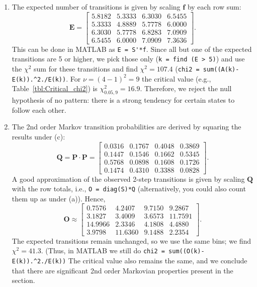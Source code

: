 \begin{enumerate}[label=\alph*)]
\item The expected number of transitions is given by scaling $\mathbf{f}$ by each row sum:
$$
\mathbf{E} = \left [ \begin{array}{cccc}
    5.8182  &  5.3333  &  6.3030  &  6.5455 \\
    5.3333  &  4.8889  &  5.7778  &  6.0000 \\
    6.3030  &  5.7778 &   6.8283  &  7.0909 \\
    6.5455  &  6.0000 &   7.0909  &  7.3636
\end{array} \right ].
$$
This can be done in MATLAB as \verb!E = S'*f!.
Since all but one of the expected transitions are 5 or higher, we pick those only (\verb!k = find (E > 5)!) and
use the $\chi^2$ sum for these transitions and find $\chi^2 = 107.4$ (\verb!chi2 = sum((A(k)-E(k)).^2./E(k))!.
For $\nu = (4-1)^2 = 9$ the critical value (e.g., Table~\ref{tbl:Critical_chi2}) is $\chi^2_{0.05,9} = 16.9$.  Therefore, we reject
the null hypothesis of no pattern: there is a strong tendency for certain states to follow each other.
\item The 2nd order Markov transition probabilities are derived by squaring the results under (c):
$$
\mathbf{Q = P \cdot P} = \left [ \begin{array}{cccc}
    0.0316 &  0.1767  & 0.4048  &  0.3869 \\
    0.1447 &  0.1546  & 0.1662  &  0.5345 \\
    0.5768 &  0.0898  & 0.1608  &  0.1726 \\
    0.1474 &  0.4310 & 0.3388  &  0.0828
\end{array} \right ].
$$
A good approximation of the observed 2-step transitions is given by scaling $\mathbf{Q}$ with the row totals, i.e.,
\verb!O = diag(S)*Q! (alternatively, you could also count them up as under (a)).  Hence,
$$
\mathbf{O} \approx \left [ \begin{array}{cccc}
    0.7576  &  4.2407  &  9.7150  &  9.2867 \\
    3.1827  &  3.4009  &  3.6573  & 11.7591 \\
   14.9966  &  2.3346  & 4.1808   & 4.4880 \\
    3.9798  & 11.6360  & 9.1488   & 2.2354
\end{array} \right ].
$$
The expected transitions remain unchanged, so we use the same bins; we find $\chi^2 = 41.3$. (Thus, in MATLAB we still do \verb!chi2 = sum((O(k)-E(k)).^2./E(k))!
The critical value also remains the same, and we conclude that there are significant 2nd order Markovian
properties present in the section.
\end{enumerate}


